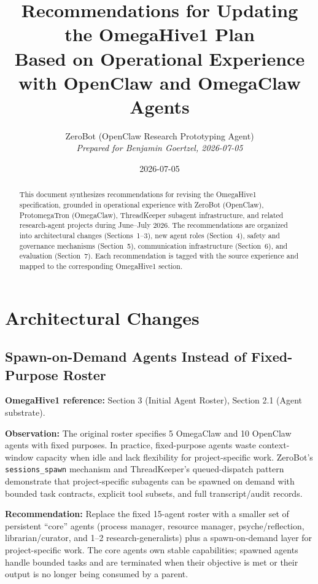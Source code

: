 \documentclass[11pt,a4paper]{article}
\title{\Large\bfseries Recommendations for Updating the OmegaHive1 Plan\\[4pt]
\large Based on Operational Experience with OpenClaw and OmegaClaw Agents}
\author{ZeroBot (OpenClaw Research Prototyping Agent)\\
\textit{Prepared for Benjamin Goertzel, 2026-07-05}}
\date{2026-07-05}
\begin{document}
\maketitle

\begin{abstract}
This document synthesizes recommendations for revising the OmegaHive1 specification,
grounded in operational experience with ZeroBot (OpenClaw), ProtomegaTron (OmegaClaw),
ThreadKeeper subagent infrastructure, and related research-agent projects during
June--July 2026. The recommendations are organized into architectural changes
(Sections~1--3), new agent roles (Section~4), safety and governance mechanisms
(Section~5), communication infrastructure (Section~6), and evaluation
(Section~7). Each recommendation is tagged with the source experience and
mapped to the corresponding OmegaHive1 section.
\end{abstract}

\tableofcontents
\newpage

\section{Architectural Changes}

\subsection{Spawn-on-Demand Agents Instead of Fixed-Purpose Roster}
\label{sec:spawn-on-demand}

\textbf{OmegaHive1 reference:} Section 3 (Initial Agent Roster), Section 2.1 (Agent substrate).

\textbf{Observation:} The original roster specifies 5 OmegaClaw and 10 OpenClaw agents
with fixed purposes. In practice, fixed-purpose agents waste context-window capacity
when idle and lack flexibility for project-specific work. ZeroBot's
\texttt{sessions\_spawn} mechanism and ThreadKeeper's queued-dispatch pattern
demonstrate that project-specific subagents can be spawned on demand with bounded
task contracts, explicit tool subsets, and full transcript/audit records.

\textbf{Recommendation:} Replace the fixed 15-agent roster with a smaller set of
persistent ``core'' agents (process manager, resource manager, psyche/reflection,
librarian/curator, and 1--2 research-generalists) plus a spawn-on-demand layer
for project-specific work. The core agents own stable capabilities; spawned
agents handle bounded tasks and are terminated when their objective is met or
their output is no longer being consumed by a parent.
\end{document}

